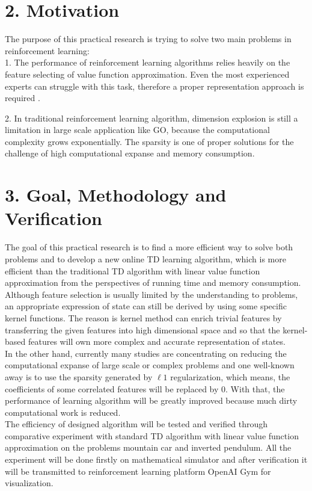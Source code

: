 \documentclass[12pt,a4paper,titlepage]{article}
\begin{document}
\section*{2. Motivation}
The purpose of this practical research is trying to solve two main problems in reinforcement learning:\\

1. The performance of reinforcement learning algorithms relies heavily on the feature selecting of value function approximation. Even the most experienced experts can struggle with this task, therefore a proper representation approach is required . 

2. In traditional reinforcement learning algorithm, dimension explosion is still a limitation in large scale application like GO, because the computational complexity grows exponentially. The sparsity is one of proper solutions for the challenge of high computational expanse and memory consumption.
\newpage
\section*{3. Goal, Methodology and Verification}
The goal of this practical research is to find a more efficient way to solve both problems and to develop a new online TD learning algorithm, which is more efficient than the traditional TD algorithm with linear value function approximation from the perspectives of running time and memory consumption.\\

Although feature selection is usually limited by the understanding to problems, an appropriate expression of state can still be derived by using some specific kernel functions. The reason is kernel method can enrich trivial features by transferring the given features into high dimensional space and so that the kernel-based features will own more complex and accurate representation of states.\\

In the other hand, currently many studies are concentrating on reducing the computational expanse of large scale or complex problems and one well-known away is to use the sparsity generated by $\ell1$ regularization, which means, the coefficients of some correlated features will be replaced by 0. With that, the performance of learning algorithm will be greatly improved because much dirty computational work is reduced.\\

The efficiency of designed algorithm will be tested and verified through comparative experiment with standard TD algorithm with linear value function approximation on the problems mountain car and inverted pendulum. All the experiment will be done firstly on mathematical simulator and after verification it will be transmitted to reinforcement learning platform OpenAI Gym for visualization.
\end{document}
